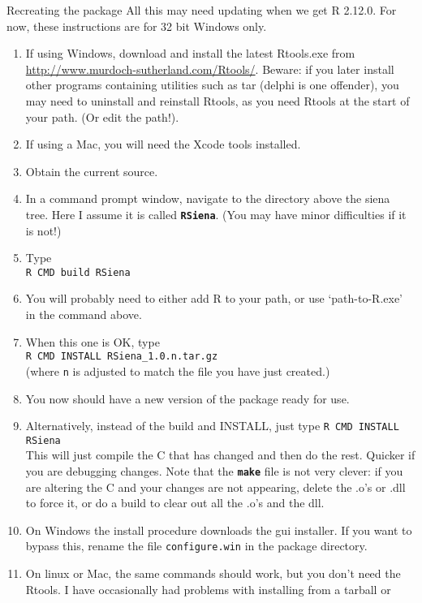 \documentclass[12pt, a4paper]{article}
\makeatletter
\renewcommand{\=}{\,=\,}
\newcommand{\+}{\,+\,}
\newcommand{\sfn}[1]{\textbf{\texttt{#1}}}
\renewcommand{\section}{\@startsection{section}{1}
                {0pt}{\baselineskip}{0.5\baselineskip}
                {\centering\sffamily} }
\makeatother
\begin{document}
\section{Recreating the package}
All this may need updating when we get R 2.12.0. For now, these instructions are
for 32 bit Windows only.
\begin{enumerate}
\item If using Windows, download and install the latest
\textsf{Rtools.exe} from
  \url{http://www.murdoch-sutherland.com/Rtools/}.  Beware: if you later install
  other programs containing utilities such as tar (delphi is one offender), you
  may need to uninstall and reinstall Rtools, as you need Rtools at the start of
  your path. (Or edit the path!).
\item If using a Mac, you will need the Xcode tools installed.
\item Obtain the current source.
\item In a command prompt window, navigate to the directory above the siena
  tree. Here I assume it is called \sfn{RSiena}. (You may have minor
  difficulties if it is not!)
\item Type\\
\verb|R CMD build RSiena|
\item You will probably need to either add R to your path, or use
  `path-to-R.exe' in the command above.
\item When this one is OK, type\\
\verb|R CMD INSTALL RSiena_1.0.n.tar.gz|\\
(where \verb|n| is adjusted to match the file you have just created.)
\item You now should have a new version of the package ready for use.
\item Alternatively, instead of the build and INSTALL, just type
\verb|R CMD INSTALL RSiena|\\
This will just compile the C that has changed and then do the rest.
Quicker if you are debugging changes. Note that the \sfn{make} file is not very
clever: if you are altering the C and your changes are not appearing, delete the
.o's or .dll to force it, or do a build
to clear out all the .o's and the dll.
\item On Windows the install procedure downloads the gui installer. If you want
  to bypass this, rename the file \verb|configure.win| in the package
  directory. 
\item On linux or Mac, the same commands should work, but you don't need the
  Rtools. I have occasionally had problems with installing from a tarball or

\end{enumerate}
\end{document}
